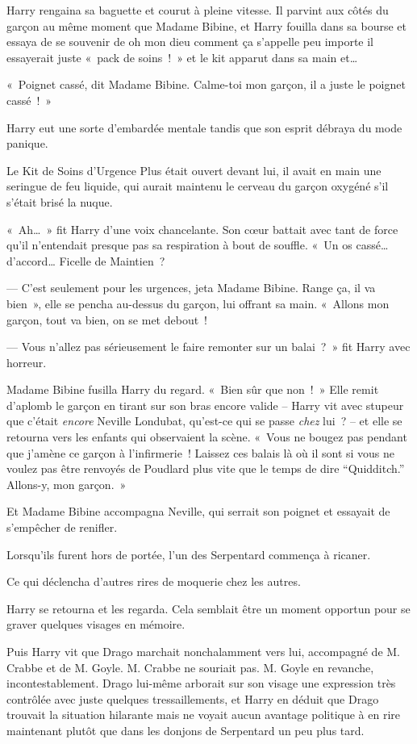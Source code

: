Harry rengaina sa baguette et courut à pleine vitesse.
Il parvint aux côtés du garçon au même moment que Madame Bibine, et Harry fouilla dans sa bourse et essaya de se souvenir de oh mon dieu comment ça s'appelle peu importe il essayerait juste «~pack de soins~!~»
et le kit apparut dans sa main et…

«~Poignet cassé, dit Madame Bibine.
Calme-toi mon garçon, il a juste le poignet cassé~!~»

Harry eut une sorte d'embardée mentale tandis que son esprit débraya du mode panique.

Le Kit de Soins d'Urgence Plus était ouvert devant lui, il avait en main une seringue de feu liquide, qui aurait maintenu le cerveau du garçon oxygéné s'il s'était brisé la nuque.

«~Ah…~» fit Harry d'une voix chancelante.
Son cœur battait avec tant de force qu'il n'entendait presque pas sa respiration à bout de souffle.
«~Un os cassé… d'accord…
Ficelle de Maintien~?

--- C'est seulement pour les urgences, jeta Madame Bibine.
Range ça, il va bien~», elle se pencha au-dessus du garçon, lui offrant sa main.
«~Allons mon garçon, tout va bien, on se met debout~!

--- Vous n'allez pas sérieusement le faire remonter sur un balai~?~»
fit Harry avec horreur.

Madame Bibine fusilla Harry du regard.
«~Bien sûr que non~!~»
Elle remit d'aplomb le garçon en tirant sur son bras encore valide -- Harry vit avec stupeur que c'était \emph{encore} Neville Londubat, qu'est-ce qui se passe \emph{chez} lui~?
-- et elle se retourna vers les enfants qui observaient la scène.
«~Vous ne bougez pas pendant que j'amène ce garçon à l'infirmerie~!
Laissez ces balais là où il sont si vous ne voulez pas être renvoyés de Poudlard plus vite que le temps de dire “Quidditch.”
Allons-y, mon garçon.~»

Et Madame Bibine accompagna Neville, qui serrait son poignet et essayait de s'empêcher de renifler.

Lorsqu'ils furent hors de portée, l'un des Serpentard commença à ricaner.

Ce qui déclencha d'autres rires de moquerie chez les autres.

Harry se retourna et les regarda.
Cela semblait être un moment opportun pour se graver quelques visages en mémoire.

Puis Harry vit que Drago marchait nonchalamment vers lui, accompagné de M. Crabbe et de M. Goyle.
M. Crabbe ne souriait pas.
M. Goyle en revanche, incontestablement.
Drago lui-même arborait sur son visage une expression très contrôlée avec juste quelques tressaillements, et Harry en déduit que Drago trouvait la situation hilarante mais ne voyait aucun avantage politique à en rire maintenant plutôt que dans les donjons de Serpentard un peu plus tard.


